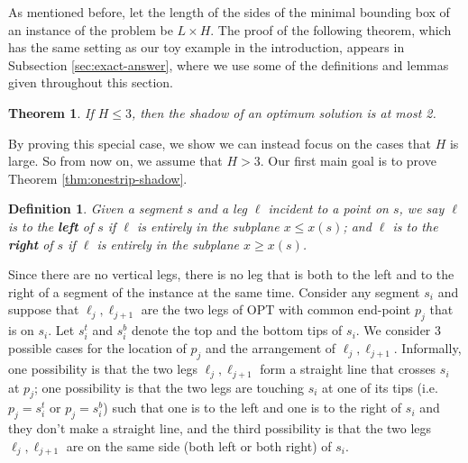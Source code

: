 \documentclass[pdflatex,sn-mathphys-num]{sn-jnl}
\theoremstyle{thmstyleone}
\newtheorem{theorem}{Theorem}
\newtheorem{definition}{Definition} %
\newcommand{\OPT}{{\text{OPT}}}
\begin{document}
As mentioned before, let the length of the sides of the minimal bounding box of an instance of the problem be $ L\times H $. 
The proof of the following theorem, which has the same setting as our toy example in the introduction, appears in Subsection \ref{sec:exact-answer}, where we use some of the definitions and lemmas given throughout this section. 
\begin{theorem}\label{thm:exact-answer}
    If $ H \le 3 $, then the shadow of an optimum solution is at most 2.
\end{theorem}

By proving this special case, we show we can instead focus on the cases that $H$ is large. So from now on, we assume that $ H > 3 $. Our first main goal is to prove Theorem \ref{thm:onestrip-shadow}. 

\begin{definition}\label{def:right-left}
    Given a segment $s$ and a leg $\ell$ incident to a point on $s$, we say
	$\ell$ is to the \textbf{left} of $s$ if $ \ell $ is entirely in the subplane $x \leq x(s)$; and
	$ \ell $ is to the \textbf{right} of $s$ if $ \ell $ is entirely in the subplane $x \ge x(s)$. 
\end{definition}
Since there are no vertical legs, there is no leg that is both to the left and to the right of a segment of the instance at the same time.
Consider any segment $s_i$  and suppose that $\ell_{j},\ell_{j+1}$ are the two legs of $\OPT$ with common end-point $p_j$ that is on $s_i$. 
Let $ s_i^t $ and $ s_i^b $ denote the top and the bottom tips of $s_i$. 
We consider 3 possible cases for the location of $p_j$ and the arrangement of $\ell_j,\ell_{j+1}$. Informally, one possibility is that the two legs $\ell_{j},\ell_{j+1}$ form a straight line that crosses $s_i$ at $p_j$; one possibility is that the two legs are touching $s_i$ at one of its tips (i.e. $p_j=s_i^t$ or $p_j=s_i^b$) such that one is to the left and one is to the right of $s_i$ and they don't make a straight line, and the third possibility is that the two legs $\ell_j,\ell_{j+1}$ are on the same side (both left or both right) of $s_i$. 
\end{document}
